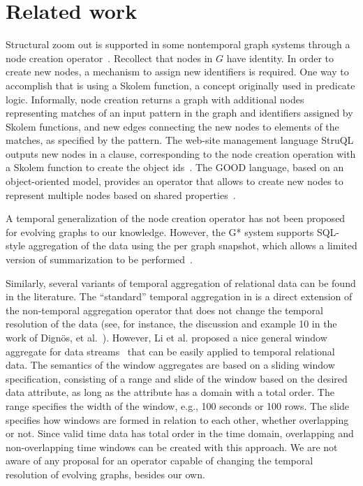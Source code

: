 \section{Related work}
\label{sec:related}

Structural zoom out is supported in some nontemporal graph systems
through a node creation operator~\cite{Wood2012}.  Recollect that
nodes in $G$ have identity.  In order to create new nodes, a mechanism
to assign new identifiers is required.  One way to accomplish that is
using a Skolem function, a concept originally used in predicate logic.
Informally, node creation returns a graph with additional nodes
representing matches of an input pattern in the graph and identifiers
assigned by Skolem functions, and new edges connecting the new nodes
to elements of the matches, as specified by the pattern.  The web-site
management language StruQL outputs new nodes in a 
clause, corresponding to the node creation operation with a Skolem
function to create the object
ids~\cite{Fernandez:1997:QLW:262762.262763}.  The GOOD language, based
on an object-oriented model, provides an  operator
that allows to create new nodes to represent multiple nodes based on
shared properties~\cite{Gyssens1994}.  

A temporal generalization of the node creation operator has not been
proposed for evolving graphs to our knowledge.  However, the G* system
supports SQL-style aggregation of the data using the
 per graph snapshot, which allows a limited
version of summarization to be performed~\cite{Labouseur2015}.

Similarly, several variants of temporal aggregation of relational data
can be found in the literature.  The ``standard'' temporal aggregation
in \tra is a direct extension of the non-temporal aggregation operator
that does not change the temporal resolution of the data (see, for
instance, the discussion and example 10 in the work of Dign{\"{o}}s,
et al.~\cite{Dignos2012}).  However, Li et al. proposed a nice general
window aggregate for data streams~\cite{Li2005} that can be easily
applied to temporal relational data.  The semantics of the window
aggregates are based on a sliding window specification, consisting of
a range and slide of the window based on the desired data attribute,
as long as the attribute has a domain with a total order.  The range
specifies the width of the window, e.g., 100 seconds or 100 rows.  The
slide specifies how windows are formed in relation to each other,
whether overlapping or not.  Since valid time data has total order in
the time domain, overlapping and non-overlapping time windows can be
created with this approach.  We are not aware of any proposal for an
operator capable of changing the temporal resolution of evolving
graphs, besides our own.

